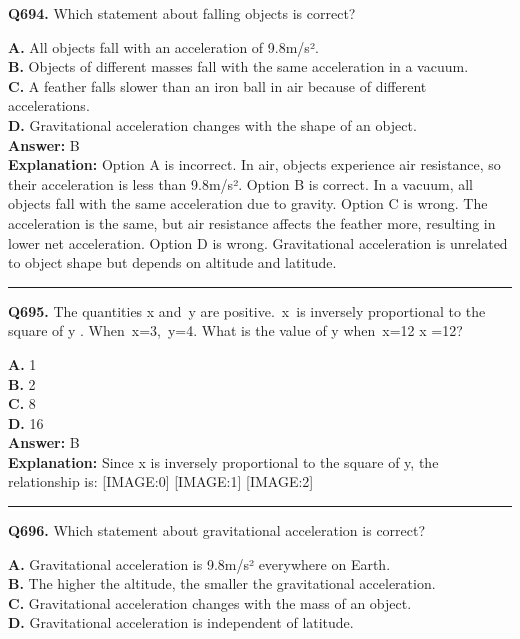 \documentclass[12pt]{article}
\begin{document}
\noindent
\textbf{Q694.} Which statement about falling objects is correct?



\textbf{A.} All objects fall with an acceleration of 9.8m/s². \\
\textbf{B.} Objects of different masses fall with the same acceleration in a vacuum. \\
\textbf{C.} A feather falls slower than an iron ball in air because of different accelerations. \\
\textbf{D.} Gravitational acceleration changes with the shape of an object. \\

\textbf{Answer:} B \\
\textbf{Explanation:} Option A is incorrect. In air, objects experience air resistance, so their acceleration is less than 9.8m/s².
Option B is correct. In a vacuum, all objects fall with the same acceleration due to gravity.
Option C is wrong. The acceleration is the same, but air resistance affects the feather more, resulting in lower net acceleration.
Option D is wrong. Gravitational acceleration is unrelated to object shape but depends on altitude and latitude.

\hrule
\vspace{1em}


\noindent
\textbf{Q695.} The quantities
x
and y are positive. x is inversely proportional to the square of
y
. When x=3, y=4. What is the value of
y
when x=12
x
=12?



\textbf{A.} 1 \\
\textbf{B.} 2 \\
\textbf{C.} 8 \\
\textbf{D.} 16 \\

\textbf{Answer:} B \\
\textbf{Explanation:} Since x is inversely proportional to the square of y, the relationship is:
[IMAGE:0]
[IMAGE:1]
[IMAGE:2]

\hrule
\vspace{1em}


\noindent
\textbf{Q696.} Which statement about gravitational acceleration is correct?



\textbf{A.} Gravitational acceleration is 9.8m/s² everywhere on Earth. \\
\textbf{B.} The higher the altitude, the smaller the gravitational acceleration. \\
\textbf{C.} Gravitational acceleration changes with the mass of an object. \\
\textbf{D.} Gravitational acceleration is independent of latitude. \\
\end{document}
